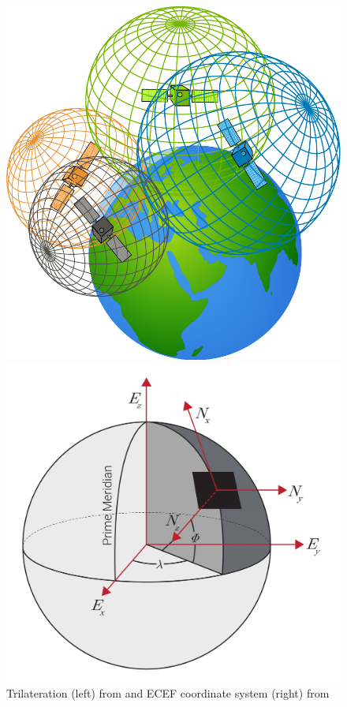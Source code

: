 \FloatBarrier
\begin{figure}[htbp]
    \centering
    \begin{minipage}{0.45\textwidth}
        \centering
        \includegraphics[width=\linewidth]{images/trilateration.pdf}
    \end{minipage}
    \hfill
    \begin{minipage}{0.45\textwidth}
        \centering
        \includegraphics[width=\linewidth]{images/ecef.jpg}
    \end{minipage}
    \label{fig:GNSS}
    \caption{Trilateration (left) from \cite{gps-satellites-trilateration} and ECEF coordinate system (right) from \cite{ECEF_coordinate_sys}}
\end{figure}
\FloatBarrier

